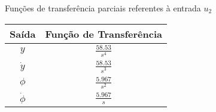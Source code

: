 \begin{quadro}[!htb]
    \centering
    \caption{Funções de transferência parciais referentes à entrada $u_2$\label{qua:resultados_quadro_tfs_u2}}
    \begin{tabular}{|c|c|}
        \hline
        \textbf{Saída} & 
        \textbf{Função de Transferência} \\
        \hline
            $y$ &
            $\frac{58.53}{s^4}$ \\[1ex]
        \hline
            $\dot{y}$ &
            $\frac{58.53}{s^3}$ \\[1ex]
        \hline
            $\phi$ &
            $\frac{5.967}{s^2}$ \\[1ex]
        \hline
            $\dot{\phi}$ &
            $\frac{5.967}{s}$ \\[1ex]
        \hline
    \end{tabular}
\end{quadro}
